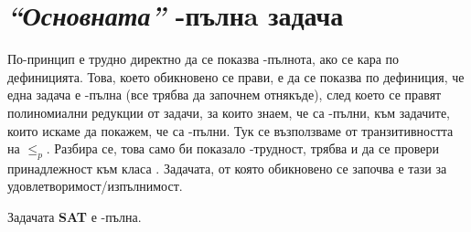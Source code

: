 \section{\textit{``Основната''} \NP-пълнa задача}

По-принцип е трудно директно да се показва \NP-пълнота, ако се кара по дефиницията.
Това, което обикновено се прави, е да се показва по дефиниция, че една задача е \NP-пълна (все трябва да започнем отнякъде), след което се правят полиномиални редукции от задачи, за които знаем, че са \NP-пълни, към задачите, които искаме да покажем, че са \NP-пълни.
Тук се възползваме от транзитивността на $\leq_p$.
Разбира се, това само би показало \NP-трудност, трябва и да се провери принадлежност към класа \NP.
Задачата, от която обикновено се започва е тази за удовлетворимост/изпълнимост.

\begin{theorem}
    Задачата \textbf{SAT} е \NP-пълна.
\end{theorem}

